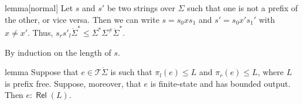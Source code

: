 \documentclass[11pt,a4paper]{amsart}
\theoremstyle{definition}
\DeclareMathOperator{\Rel}{\mathsf{Rel}}
\begin{document}
\begin{theoremEnd}{lemma}[normal]
  \label{lem:mismatch}
  Let $s$ and $s'$ be two strings over $ \Sigma $ such that one is not a prefix of the
  other, or vice versa.  Then we can write $s = s_0xs_1$ and $s' = s_0x's_1'$
  with $x  \neq  x'$.  Thus, $s_rs'_l\ddot{ \Sigma }^*  \leq   \Sigma ^* \Sigma ^{ \neq }\ddot{ \Sigma }^*.$
\end{theoremEnd}

\begin{proofEnd}
  By induction on the length of $s$.
\end{proofEnd}

\begin{theoremEnd}{lemma}
  \label{lem:representable-sufficient}
  Suppose that $e  \in  \mathcal{T}\ddot{ \Sigma }$ is such that $ \pi _l(e)  \leq  L$ and
  $ \pi _r(e)  \leq  L$, where $L$ is prefix free.  Suppose, moreover, that $e$ is
  finite-state and has bounded output.  Then $e : \Rel(L)$.
\end{theoremEnd}
\end{document}
